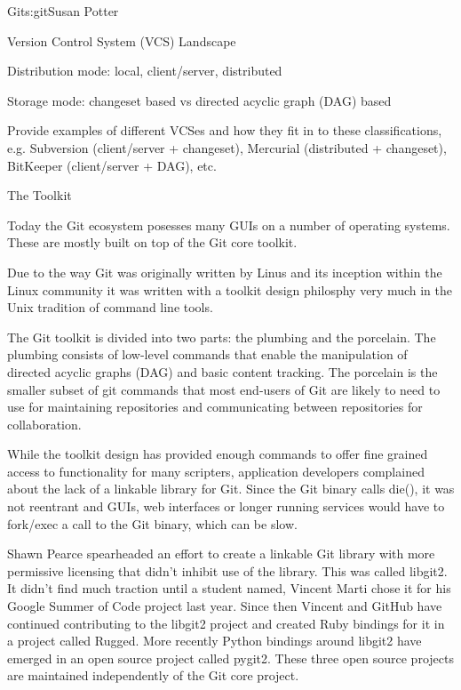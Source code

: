 \begin{aosachapter}{Git}{s:git}{Susan Potter}
\begin{aosasect1}{Version Control System (VCS) Landscape}
\begin{aosaitemize}
  \item Distribution mode: local, client/server, distributed
  \item Storage mode: changeset based vs directed acyclic graph (DAG) based
\end{aosaitemize}

Provide examples of different VCSes and how they fit in to these
classifications, e.g. Subversion (client/server + changeset), Mercurial
(distributed + changeset), BitKeeper (client/server + DAG), etc.

\end{aosasect1}


\begin{aosasect1}{The Toolkit}

Today the Git ecosystem posesses many GUIs on a number of operating systems.
These are mostly built on top of the Git core toolkit.

Due to the way Git was originally written by Linus and its inception within
the Linux community it was written with a toolkit design philosphy very much
in the Unix tradition of command line tools.

The Git toolkit is divided into two parts: the plumbing and
the porcelain. The plumbing consists of low-level commands that enable
the manipulation of directed acyclic graphs (DAG) and basic content
tracking. The porcelain is the smaller subset of git commands that most
end-users of Git are likely to need to use for maintaining repositories and
communicating between repositories for collaboration.

While the toolkit design has provided enough commands to offer fine grained
access to functionality for many scripters, application developers
complained about the lack of a linkable library for Git. Since the Git binary
calls die(), it was not reentrant and GUIs, web interfaces or longer running
services would have to fork/exec a call to the Git binary, which can be slow.

Shawn Pearce spearheaded an effort to create a linkable Git library with
more permissive licensing that didn't inhibit use of the library. This was
called libgit2. It didn't find much traction until a student named, Vincent
Marti chose it for his Google Summer of Code project last year. Since then
Vincent and GitHub have continued contributing to the libgit2 project and
created Ruby bindings for it in a project called Rugged. More recently
Python bindings around libgit2 have emerged in an open source project
called pygit2. These three open source projects are maintained independently
of the Git core project.


\end{aosasect1}
\end{aosachapter}
